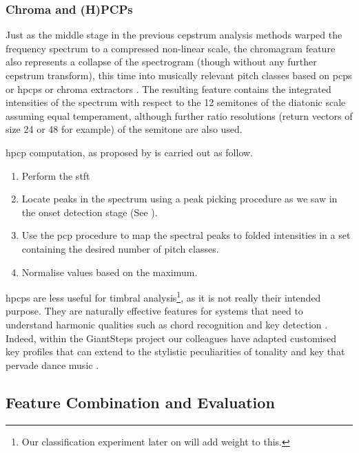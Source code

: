 {{{{\subsubsection{Chroma and (H)PCPs}

Just as the middle stage in the previous cepstrum analysis methods warped the frequency spectrum to a compressed non-linear scale, the chromagram feature also represents a collapse of the spectrogram (though without any further cepstrum transform), this time into musically relevant pitch classes based on \acrfull{pcp}s \citep{Fujishima1999} or \acrfull{hpcp}s \citep{Gomez2004} or chroma extractors \citep{Orio2006}. The resulting feature contains the integrated intensities of the spectrum with respect to the 12 semitones of the diatonic scale assuming equal temperament, although further ratio resolutions (return vectors of size 24 or 48 for example) of the semitone are also used.

\acrshort{hpcp} computation, as proposed by \cite{Gomez2006} is carried out as follow. 

\begin{enumerate}
  \item Perform the \acrshort{stft}
  \item Locate peaks in the spectrum using a peak picking procedure as we saw in the onset detection stage (See ).
  \item Use the \acrshort{pcp} procedure to map the spectral peaks to folded intensities in a set containing the desired number of pitch classes.
  \item Normalise values based on the maximum.
\end{enumerate}

\acrshort{hpcp}s are less useful for timbral analysis\footnote{Our classification experiment later on will add weight to this.}, as it is not really their intended purpose. They are naturally effective features for systems that need to understand harmonic qualities such as chord recognition \citep{Fujishima1999} and key detection \citep{Gomez2004}. Indeed, within the GiantSteps project our colleagues have adapted customised key profiles that can extend to the stylistic peculiarities of tonality and key that pervade dance music \citep{Faraldo2016, Faraldo2017, Faraldo2017b}.

\subsection{Feature Combination and Evaluation}

}}}}
